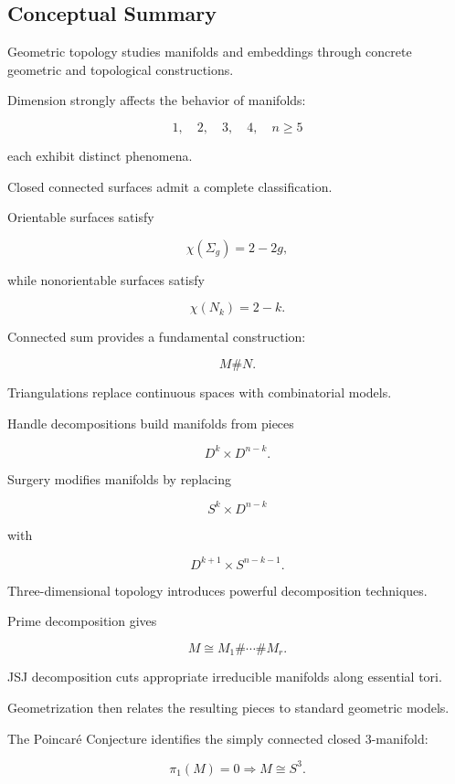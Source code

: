 \subsection{Conceptual Summary}
\label{subsec:geometric-topology-summary}

Geometric topology studies manifolds and embeddings through concrete
geometric and topological constructions.

Dimension strongly affects the behavior of manifolds:

\[
\boxed{
1,\quad2,\quad3,\quad4,\quad n\geq5
}
\]

each exhibit distinct phenomena.

Closed connected surfaces admit a complete classification.

Orientable surfaces satisfy

\[
\boxed{
\chi(\Sigma_g)=2-2g,
}
\]

while nonorientable surfaces satisfy

\[
\boxed{
\chi(N_k)=2-k.
}
\]

Connected sum provides a fundamental construction:

\[
\boxed{
M\#N.
}
\]

Triangulations replace continuous spaces with combinatorial models.

Handle decompositions build manifolds from pieces

\[
\boxed{
D^k\times D^{n-k}.
}
\]

Surgery modifies manifolds by replacing

\[
S^k\times D^{n-k}
\]

with

\[
D^{k+1}\times S^{n-k-1}.
\]

Three-dimensional topology introduces powerful decomposition techniques.

Prime decomposition gives

\[
\boxed{
M
\cong
M_1\#\cdots\#M_r.
}
\]

JSJ decomposition cuts appropriate irreducible manifolds along essential
tori.

Geometrization then relates the resulting pieces to standard geometric
models.

The Poincar\'e Conjecture identifies the simply connected closed
\(3\)-manifold:

\[
\boxed{
\pi_1(M)=0
\Longrightarrow
M\cong S^3.
}
\]


